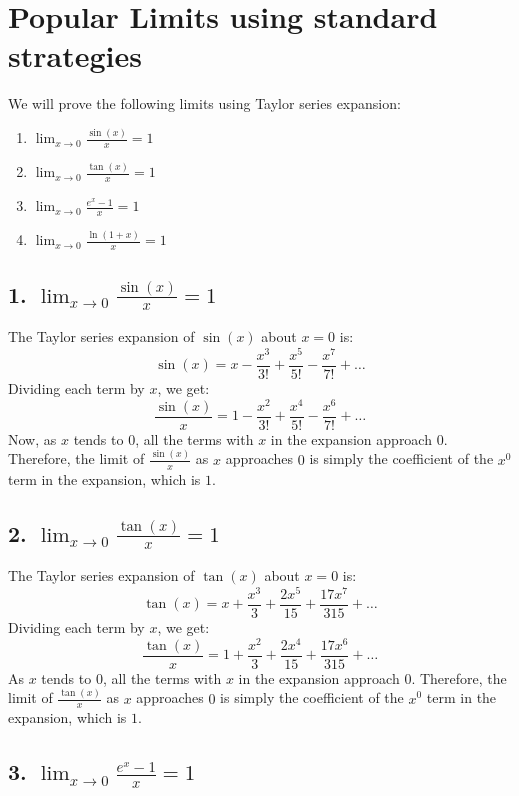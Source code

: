 \section{Popular Limits using standard strategies}

We will prove the following limits using Taylor series expansion:

\begin{outline}
\begin{enumerate}
    \item $\lim_{x \to 0} \frac{\sin(x)}{x} = 1$
    \item $\lim_{x \to 0} \frac{\tan(x)}{x} = 1$
    \item $\lim_{x \to 0} \frac{e^x - 1}{x} = 1$
    \item $\lim_{x \to 0} \frac{\ln(1 + x)}{x} = 1$
\end{enumerate}
\end{outline}

\subsection*{1. $\lim_{x \to 0} \frac{\sin(x)}{x} = 1$}

The Taylor series expansion of $\sin(x)$ about $x = 0$ is:
\[
\sin(x) = x - \frac{x^3}{3!} + \frac{x^5}{5!} - \frac{x^7}{7!} + \ldots
\]
Dividing each term by $x$, we get:
\[
\frac{\sin(x)}{x} = 1 - \frac{x^2}{3!} + \frac{x^4}{5!} - \frac{x^6}{7!} + \ldots
\]
Now, as $x$ tends to $0$, all the terms with $x$ in the expansion approach $0$. Therefore, the limit of $\frac{\sin(x)}{x}$ as $x$ approaches $0$ is simply the coefficient of the $x^0$ term in the expansion, which is $1$.

\subsection*{2. $\lim_{x \to 0} \frac{\tan(x)}{x} = 1$}

The Taylor series expansion of $\tan(x)$ about $x = 0$ is:
\[
\tan(x) = x + \frac{x^3}{3} + \frac{2x^5}{15} + \frac{17x^7}{315} + \ldots
\]
Dividing each term by $x$, we get:
\[
\frac{\tan(x)}{x} = 1 + \frac{x^2}{3} + \frac{2x^4}{15} + \frac{17x^6}{315} + \ldots
\]
As $x$ tends to $0$, all the terms with $x$ in the expansion approach $0$. Therefore, the limit of $\frac{\tan(x)}{x}$ as $x$ approaches $0$ is simply the coefficient of the $x^0$ term in the expansion, which is $1$.

\subsection*{3. $\lim_{x \to 0} \frac{e^x - 1}{x} = 1$}

